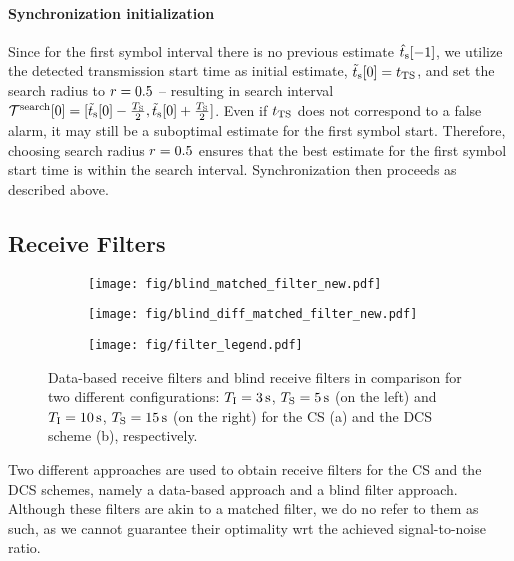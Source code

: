 \paragraph{Synchronization initialization}
Since for the first symbol interval there is no previous estimate $\hat{t}_\mathrm{s}[-1]$, we utilize the detected transmission start time as initial estimate, $\Tilde{t}_\mathrm{s}[0] = t_\mathrm{TS}$, and set the search radius to $r=0.5$ -- resulting in search interval $\mathcal{T}^{\mathrm{search}}[0] = [\Tilde{t}_\mathrm{s}[0] - \frac{T_{\mathrm{S}}}{2}, \Tilde{t}_\mathrm{s}[0] + \frac{T_{\mathrm{S}}}{2}]$. Even if $t_\mathrm{TS}$ does not correspond to a false alarm, it may still be a suboptimal estimate for the first symbol start. Therefore, choosing search radius $r=0.5$ ensures that the best estimate for the first symbol start time is within the search interval. Synchronization then proceeds as described above.
%
\scaleSubsection
\subsection{Receive Filters} \label{matched_filter}
\scaleSubsectionBelow
\begin{figure}[!tbp]
\vspace*{-1cm}
    \centering
    \begin{subfigure}[b]{0.49\textwidth}
        \caption{}
        \vspace{-3pt}
        \texttt{[image: fig/blind\_matched\_filter\_new.pdf]}
        \label{fig:BlindCorrFilter}
        \vspace*{-5mm}
    \end{subfigure}
    \begin{subfigure}[b]{0.49\textwidth}
        \caption{}
        \vspace{-3pt}
        \texttt{[image: fig/blind\_diff\_matched\_filter\_new.pdf]}
        \label{fig:BlindDiffFilter}
        \vspace*{-5mm}
    \end{subfigure}
    \vspace*{0mm}
    \begin{subfigure}[b]{\textwidth}
        \texttt{[image: fig/filter\_legend.pdf]}
    \end{subfigure}
    \vspace*{-9mm}
    \caption{Data-based receive filters and blind receive filters in comparison for two different configurations: $T_{\mathrm{I}}=\SI{3}{\second}$, $T_{\mathrm{S}}=\SI{5}{\second}$ (on the left) and $T_{\mathrm{I}}=\SI{10}{\second}$, $T_{\mathrm{S}}=\SI{15}{\second}$ (on the right) for the \acs{CS} (a) and the \acs{DCS} scheme (b), respectively.}
    \label{fig:ReceiveFilter}
    \vspace*{-8mm}
\end{figure}
Two different approaches are used to obtain receive filters for the \ac{CS} and the \ac{DCS} schemes, namely a data-based approach and a blind filter approach. Although these filters are akin to a matched filter, we do no refer to them as such, as we cannot guarantee their optimality \ac{wrt} the achieved signal-to-noise ratio.
%
\scaleSubsubsection
